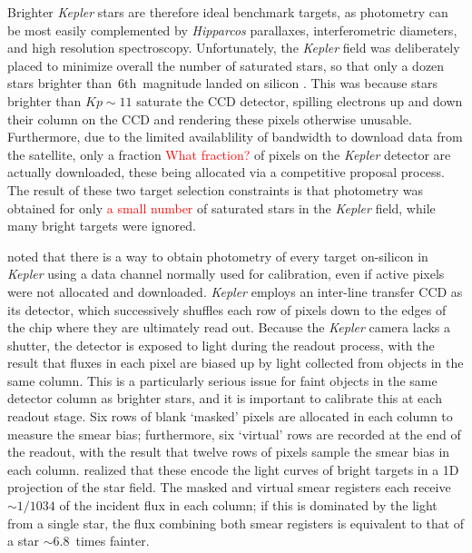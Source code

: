 \documentclass[a4paper,fleqn,usenatbib]{mnras}
\newcommand{\kepler}{\emph{Kepler}\xspace}
\newcommand{\hipparcos}{\emph{Hipparcos}\xspace}
\begin{document}
Brighter \kepler stars are therefore ideal benchmark targets, as photometry can be most easily complemented by \hipparcos parallaxes, interferometric diameters, and high resolution spectroscopy.  
Unfortunately, the \kepler field was deliberately placed to minimize overall the number of saturated stars, so that only a dozen stars brighter than~6th~magnitude landed on silicon \citep{2010ApJ...713L..79K}. This was because stars brighter than $Kp \sim 11$ saturate the CCD detector, spilling electrons up and down their column on the CCD and rendering these pixels otherwise unusable. Furthermore, due to the limited availablility of bandwidth to download data from the satellite, only a fraction \textcolor{red}{What fraction?} of pixels on the \kepler detector are actually downloaded, these being allocated via a competitive proposal process. The result of these two target selection constraints is that photometry was obtained for only \textcolor{red}{a small number} of saturated stars in the \kepler field, while many bright targets were ignored. 

\citet{orig_smear} noted that there is a way to obtain photometry of every target on-silicon in \kepler using a data channel normally used for calibration, even if active pixels were not allocated and downloaded. \kepler employs an inter-line transfer CCD as its detector, which successively shuffles each row of pixels down to the edges of the chip where they are ultimately read out. Because the \kepler camera lacks a shutter, the detector is exposed to light during the readout process, with the result that fluxes in each pixel are biased up by light collected from objects in the same column. This is a particularly serious issue for faint objects in the same detector column as brighter stars, and it is important to calibrate this at each readout stage. Six rows of blank `masked' pixels are allocated in each column to measure the smear bias; furthermore, six `virtual' rows are recorded at the end of the readout, with the result that twelve rows of pixels sample the smear bias in each column. \citet{orig_smear} realized that these encode the light curves of bright targets in a 1D projection of the star field. The masked and virtual smear registers each receive $\sim 1/1034$ of the incident flux in each column; if this is dominated by the light from a single star, the flux combining both smear registers is equivalent to that of a star $\sim 6.8$~times fainter. 
\end{document}
